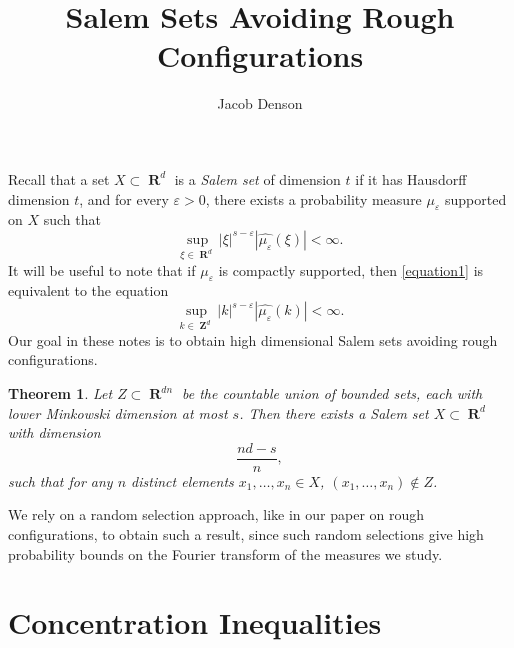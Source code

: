 \documentclass[12pt,reqno]{article}
\title{Salem Sets Avoiding Rough Configurations}
\author{Jacob Denson}
\numberwithin{equation}{section}
\DeclareMathOperator{\RR}{\mathbf{R}}
\DeclareMathOperator{\ZZ}{\mathbf{Z}}
\newtheorem{theorem}{Theorem}
\begin{document}
\maketitle

Recall that a set $X \subset \RR^d$ is a \emph{Salem set} of dimension $t$ if it has Hausdorff dimension $t$, and for every $\varepsilon > 0$, there exists a probability measure $\mu_\varepsilon$ supported on $X$ such that
%
\begin{equation} \label{equation1}
    \sup_{\xi \in \RR^d} |\xi|^{s - \varepsilon} |\widehat{\mu_\varepsilon}(\xi)| < \infty.
\end{equation}
%
It will be useful to note that if $\mu_\varepsilon$ is compactly supported, then \eqref{equation1} is equivalent to the equation
%
\begin{equation}
    \sup_{k \in \ZZ^d} |k|^{s - \varepsilon} |\widehat{\mu_\varepsilon}(k)| < \infty.
\end{equation}
%
Our goal in these notes is to obtain high dimensional Salem sets avoiding rough configurations.

\begin{theorem} \label{maintheorem}
    Let $Z \subset \RR^{dn}$ be the countable union of bounded sets, each with lower Minkowski dimension at most $s$. Then there exists a Salem set $X \subset \RR^d$ with dimension
    \[ \frac{nd - s}{n}, \]
    such that for any $n$ distinct elements $x_1, \dots, x_n \in X$, $(x_1, \dots, x_n) \not \in Z$.
\end{theorem}

We rely on a random selection approach, like in our paper on rough configurations, to obtain such a result, since such random selections give high probability bounds on the Fourier transform of the measures we study.

\section{Concentration Inequalities}
\end{document}
